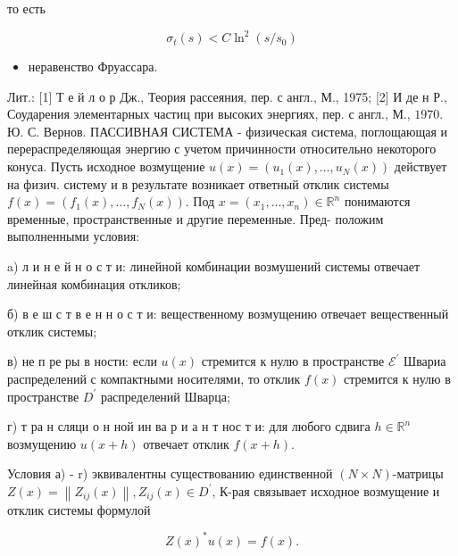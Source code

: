 \documentclass[10pt]{article}
\begin{document}
то есть



\[

\sigma_{t}(s)<C \ln ^{2}\left(s / s_{0}\right)

\]



\begin{itemize}

  \item неравенство Фруассара.

\end{itemize}



Лит.: [1] Т е й л о р Дж., Теория рассеяния, пер. с англ., М., 1975; [2] И де н Р., Соударения элементарных частиц при высоких энергиях, пер. с англ., М., $1970 . \quad$ Ю. С. Вернов. ПАССИВНАЯ СИСТЕМА - физическая система, поглощающая и перераспределяющая энергию с учетом причинности относительно некоторого конуса. Пусть исходное возмущение $u(x)=\left(u_{1}(x), \ldots, u_{N}(x)\right)$ действует на физич. систему и в результате возникает ответный отклик системы $f(x)=\left(f_{1}(x), \ldots, f_{N}(x)\right)$. Под $x=\left(x_{1}, \ldots, x_{n}\right) \in \mathbb{R}^{n}$ понимаются временные, пространственные и другие переменные. Пред- положим выполненными условия:



a) л и н е й н о с т и: линейной комбинации возмушений системы отвечает линейная комбинация откликов;



б) в е ш с т в е н н о с т и: вещественному возмущению отвечает вещественный отклик системы;



в) не п ре ры в ности: если $u(x)$ стремится к нулю в пространстве $\mathscr{E}^{\prime}$ Швариа распределений с компактными носителями, то отклик $f(x)$ стремится к нулю в пространстве $D^{\prime}$ распределений Шварца;



г) т ра н сляци о н ной ин ва р и а н т нос т и: для любого сдвига $h \in \mathbb{R}^{n}$ возмущению $u(x+h)$ отвечает отклик $f(x+h)$.



Условия а) - r) эквивалентны существованию единственной $(N \times N)$-матрицы $Z(x)=\left\|Z_{i j}(x)\right\|, Z_{i j}(x) \in D^{\prime}$, К-рая связывает исходное возмущение и отклик системы формулой



\[

Z(x)^{*} u(x)=f(x) .

\]
\end{document}
